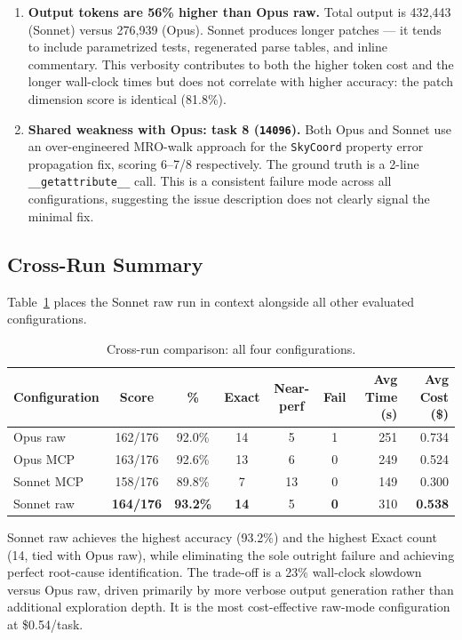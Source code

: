 \begin{enumerate}
\item \textbf{Output tokens are 56\% higher than Opus raw.}
      Total output is 432{,}443 (Sonnet) versus 276{,}939 (Opus).
      Sonnet produces longer patches --- it tends to include parametrized
      tests, regenerated parse tables, and inline commentary.  This
      verbosity contributes to both the higher token cost and the longer
      wall-clock times but does not correlate with higher accuracy: the
      patch dimension score is identical (81.8\%).

\item \textbf{Shared weakness with Opus: task 8 (\texttt{14096}).}
      Both Opus and Sonnet use an over-engineered MRO-walk approach
      for the \texttt{SkyCoord} property error propagation fix,
      scoring 6--7/8 respectively.  The ground truth is a 2-line
      \texttt{\_\_getattribute\_\_} call.  This is a consistent
      failure mode across all configurations, suggesting the issue
      description does not clearly signal the minimal fix.

\end{enumerate}

\subsection{Cross-Run Summary}\label{sec:raw-sonnet-crossrun}

Table~\ref{tab:crossrun-raw-sonnet} places the Sonnet raw run in context
alongside all other evaluated configurations.

\begin{table}[h]
\centering
\small
\caption{Cross-run comparison: all four configurations.}\label{tab:crossrun-raw-sonnet}
\setlength{\tabcolsep}{5pt}
\begin{tabular}{lcccccrr}
\toprule
\textbf{Configuration} & \textbf{Score} & \textbf{\%} & \textbf{Exact} & \textbf{Near-perf} & \textbf{Fail} & \textbf{Avg Time (s)} & \textbf{Avg Cost (\$)} \\
\midrule
Opus raw      & 162/176 & 92.0\% & 14 &  5 & 1 & 251 & 0.734 \\
Opus MCP      & 163/176 & 92.6\% & 13 &  6 & 0 & 249 & 0.524 \\
Sonnet MCP    & 158/176 & 89.8\% &  7 & 13 & 0 & 149 & 0.300 \\
Sonnet raw    & \textbf{164/176} & \textbf{93.2\%} & \textbf{14} & 5 & \textbf{0} & 310 & \textbf{0.538} \\
\bottomrule
\end{tabular}
\end{table}

\noindent
Sonnet raw achieves the highest accuracy (93.2\%) and the highest
Exact count (14, tied with Opus raw), while eliminating the sole
outright failure and achieving perfect root-cause identification.
The trade-off is a 23\% wall-clock slowdown versus Opus raw, driven
primarily by more verbose output generation rather than additional
exploration depth.  It is the most cost-effective raw-mode
configuration at \$0.54/task.
